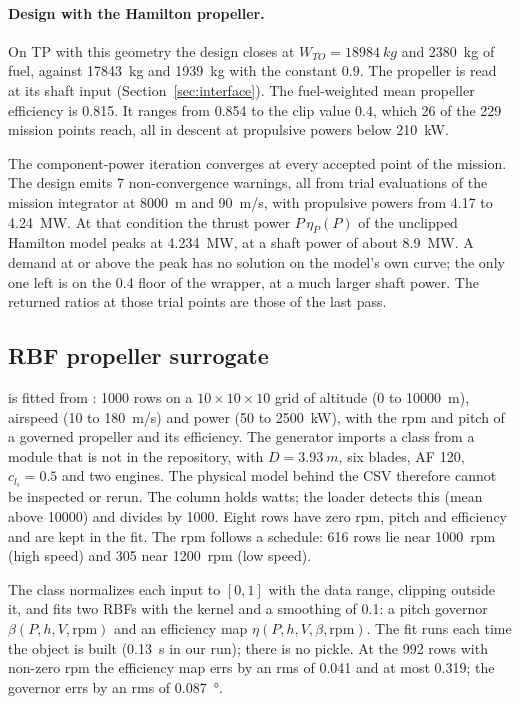 \documentclass[a4paper,11pt]{article}
\begin{document}
\paragraph{Design with the Hamilton propeller.} On TP with this geometry the design closes at
$W_{TO} = \SI{18984}{kg}$ and \SI{2380}{kg} of fuel, against \SI{17843}{kg} and \SI{1939}{kg}
with the constant 0.9. The propeller is read at its shaft input (Section~\ref{sec:interface}).
The fuel-weighted mean propeller efficiency is 0.815. It ranges from 0.854 to the clip value 0.4,
which 26 of the 229 mission points reach, all in descent at propulsive powers below
\SI{210}{kW}.

The component-power iteration converges at every accepted point of the mission. The design
emits 7 non-convergence warnings, all from trial evaluations of the mission integrator at
\SI{8000}{m} and \SI{90}{m/s}, with propulsive powers from 4.17 to \SI{4.24}{MW}. At that
condition the thrust power $P\,\eta_P(P)$ of the unclipped Hamilton model peaks at
\SI{4.234}{MW}, at a shaft power of about \SI{8.9}{MW}. A demand at or above the peak has no
solution on the model's own curve; the only one left is on the 0.4 floor of the wrapper, at a
much larger shaft power. The returned ratios at those trial points are those of the last pass.

\subsection{RBF propeller surrogate}\label{sec:prop-rbf}
 is fitted from
: 1000 rows on a $10\times10\times10$ grid of altitude (0 to
\SI{10000}{m}), airspeed (10 to \SI{180}{m/s}) and power (50 to \SI{2500}{kW}), with the rpm and
pitch of a governed propeller and its efficiency. The generator
 imports a  class from a module
 that is not in the repository, with $D = \SI{3.93}{m}$, six blades,
AF 120, $c_{l_i} = 0.5$ and two engines. The physical model behind the CSV therefore cannot be
inspected or rerun. The column  holds watts; the loader detects this (mean
above \num{10000}) and divides by 1000. Eight rows have zero rpm, pitch and efficiency and are
kept in the fit. The rpm follows a schedule: 616 rows lie near \SI{1000}{rpm} (high speed) and
305 near \SI{1200}{rpm} (low speed).

The class normalizes each input to $[0, 1]$ with the data range, clipping outside it, and fits
two RBFs with the  kernel and a smoothing of 0.1: a pitch governor
$\beta(P, h, V, \mathrm{rpm})$ and an efficiency map $\eta(P, h, V, \beta, \mathrm{rpm})$. The fit
runs each time the object is built (\SI{0.13}{s} in our run); there is no pickle. At the 992 rows with
non-zero rpm the efficiency map errs by an rms of 0.041 and at most 0.319; the governor errs by
an rms of \SI{0.087}{\degree}.
\end{document}
